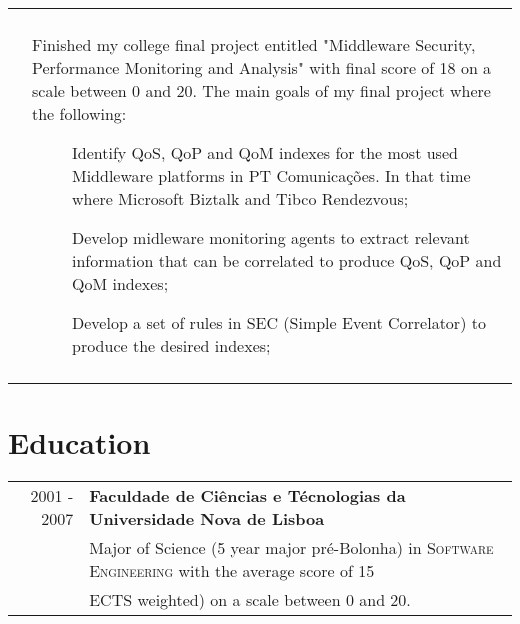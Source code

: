 \documentclass[a4paper,10pt]{article}
\begin{document}
\begin{tabular}{rp{11cm}}
\begin{compactitem}
   \end{compactitem}\vspace{-1em} \\
  & \begin{compactitem}
   \item Finished my college final project entitled "Middleware Security, Performance Monitoring and Analysis" with final score of 18 on a scale between 0 and 20.
   The main goals of my final project where the following: 
   \begin{description}
		\item[] Identify QoS, QoP and QoM indexes for the most used Middleware platforms in PT Comunicações. In that time where Microsoft Biztalk and Tibco Rendezvous;
   \end{description}
   \begin{description}
		\item[] Develop midleware monitoring agents to extract relevant information that can be correlated to produce QoS, QoP and QoM indexes;
   \end{description}
      \begin{description}
		\item[] Develop a set of rules in SEC (Simple Event Correlator) to produce the desired indexes;
   \end{description}
   \end{compactitem}\vspace{-1em} \\
\multicolumn{2}{c}{} \\

\end{tabular}

\section{Education}
\begin{tabular}{rl}	
2001 - 2007 & \textbf{Faculdade de Ciências e Técnologias da Universidade Nova de Lisboa}\\
 & Major of Science (5 year major pré-Bolonha) in \textsc{Software Engineering} with the average score of 15\\
 & ECTS weighted) on a scale between 0 and 20. \\
\end{tabular}
\end{document}
